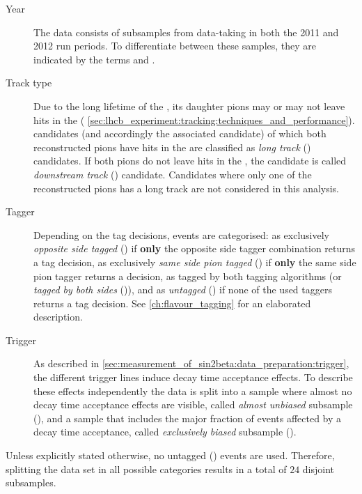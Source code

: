 \begin{description}
  \item[Year] The data consists of subsamples from data-taking in both the 2011
and 2012 run periods. To differentiate between these samples, they are indicated
by the terms \textbf{\catOO} and \textbf{\catOT}.

  \item[Track type] Due to the long lifetime of the \KS, its daughter pions may
or may not leave hits in the \VELO (\cf
\cref{sec:lhcb_experiment:tracking:techniques_and_performance}). \KS candidates
(and accordingly the associated \Bmeson candidate) of which both reconstructed
pions have hits in the \VELO are classified as \emph{long track}
(\textbf{\catLL}) candidates. If both pions do not leave hits in the \VELO, the
candidate is called \emph{downstream track} (\textbf{\catDD}) candidate.
Candidates where only one of the reconstructed pions has a long track are not
considered in this analysis.
  
  \item[Tagger] Depending on the tag decisions, events are categorised: as
  exclusively \emph{opposite side tagged} (\textbf{\catOS}) if \textbf{only} the
opposite side tagger combination returns a tag decision, as exclusively
\emph{same side pion tagged} (\textbf{\catSS}) if \textbf{only} the same side
pion tagger returns a decision, as tagged by both tagging algorithms (or
\emph{tagged by both sides} (\textbf{\catBS})), and as \emph{untagged}
(\textbf{\catUT}) if none of the used taggers returns a tag decision. See
\cref{ch:flavour_tagging} for an elaborated description.
  
  \item[Trigger] As described in
\cref{sec:measurement_of_sin2beta:data_preparation:trigger}, the different
trigger lines induce decay time acceptance effects. To describe these effects
independently the data is split into a sample where almost no decay time
acceptance effects are visible, called \emph{almost unbiased} subsample
(\textbf{\catAU}), and a sample that includes the major fraction of events
affected by a decay time acceptance, called \emph{exclusively biased} subsample
(\textbf{\catEB}).
\end{description}

Unless explicitly stated otherwise, no untagged (\textbf{\catUT}) events are
used. Therefore, splitting the data set in all possible categories results in a
total of $\num{24}$ disjoint subsamples.


